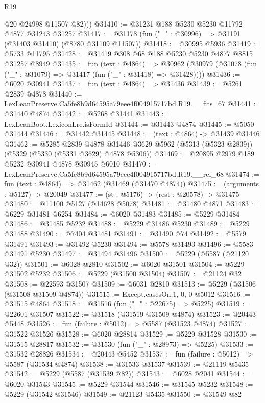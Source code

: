 \begin{lexlean}{R19}
\begin{coremodule}
          @20
          @24998
          @11507
          @82)))
@31410 := @31231 @188 @5230 @5230 @11792 @4877 @31243 @31257
@31417 := @31178 (fun ("_" : @30996) => @31191 (@31403 @31410) (@8780 @31109 @11507))
@31418 := @30995 @5936
@31419 := @5733 @11795
@31428 := @31419 @308 @68 @188 @5230 @5230 @4877 @8815 @31257 @8949
@31435 := fun (text : @4864) =>
  @30962 (@30979 (@31078 (fun ("_" : @31079) => @31417 (fun ("_" : @31418) => @31428))))
@31436 := @6020 @30941
@31437 := fun (text : @4864) => @31436
@31439 := @5261 @2839 @4878
@31440 := LexLeanPreserve.Ca5fe8b9d64595a79eee4f004915717bd.R19.__fits_67
@31441 := @31440 @4874
@31442 := @5268 @31441
@31443 := LexLeanBoot.LexiconLre.isFormId
@31444 := @31443 @4874
@31445 := @5050 @31444
@31446 := @31442 @31445
@31448 := (text : @4864) -> @31439 @31446
@31462 := @5285
    @2839
    @4878
    @31446
    @3629
    @5962
    (@5313 (@5323 @2839))
    (@5329 (@5330 (@5331 @3629) @4878 @5306))
@31469 := @20895 @2979 @189 @5232 @30941 @4878 @30945 @6010
@31470 := LexLeanPreserve.Ca5fe8b9d64595a79eee4f004915717bd.R19.__rel_68
@31474 := fun (text : @4864) => @31462 (@31469 (@31470 @4874))
@31475 := (arguments : @5127) -> @20049
@31477 := (st : @5176) -> (rest : @20578) -> @31475
@31480 := @11100 @5127 (@14628 @5078)
@31481 := @31480 @4871
@31483 := @6229 @31481 @6254
@31484 := @6020 @31483
@31485 := @5229 @31484
@31486 := @31485 @5232
@31488 := @5229 @31486 @5230
@31489 := @5229 @31488
@31490 := @7404 @31481
@31491 := @31490 @74
@31492 := @5579 @31491
@31493 := @31492 @5230
@31494 := @5578 @31493
@31496 := @5583 @31491 @5230
@31497 := @31494 @31496
@31500 := @5229 (@5587 (@21120 @32))
@31501 := @6028 @2810
@31502 := @6020 @31501
@31504 := @5229 @31502 @5232
@31506 := @5229 (@31500 @31504)
@31507 := @21124 @32
@31508 := @22593 @31507
@31509 := @6031 @2810
@31513 := @5229 (@31506 (@31508 @31509 @4874))
@31515 := Except.casesOn.{1, 0, 0} @5012
@31516 := @31515 @4864
@31518 := @31516 (fun ("_" : @22675) => @5225)
@31519 := @22601 @31507
@31522 := @31518 (@31519 @31509 @4874)
@31523 := @20443 @5448
@31526 := fun (failure : @5012) => @5587 (@31523 @4874)
@31527 := @31522 @31526
@31528 := @6020 @28814
@31529 := @5229 @31528
@31530 := @31515 @28817
@31532 := @31530 (fun ("_" : @28973) => @5225)
@31533 := @31532 @28826
@31534 := @20443 @5452
@31537 := fun (failure : @5012) => @5587 (@31534 @4874)
@31538 := @31533 @31537
@31539 := @21119 @5435
@31542 := @5229 (@5587 (@31539 @82))
@31543 := @6028 @2041
@31544 := @6020 @31543
@31545 := @5229 @31544
@31546 := @31545 @5232
@31548 := @5229 (@31542 @31546)
@31549 := @21123 @5435
@31550 := @31549 @82

\end{coremodule}
\end{lexlean}
